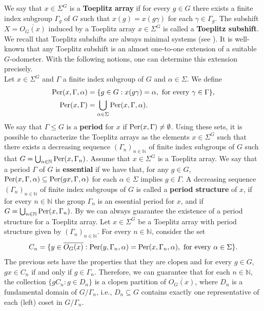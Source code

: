 \documentclass[titlepage,reqno,10pt]{amsart}
\theoremstyle{definition}
\def\Per{{\rm Per}}
\begin{document}
We say that $x\in\Sigma^G$ is a \textbf{Toeplitz array} if for every $g\in G$ there exists  a finite index subgroup $\Gamma_g$ of $G$ such that $x(g)=x(g\gamma)$ for each $\gamma\in \Gamma_g$.
The subshift $X=\overline{O_G(x)}$ induced by a Toeplitz array $x\in\Sigma^G$ is called a \textbf{Toeplitz subshift}. 
We recall that Toeplitz subshifts are always minimal systems  (see \cite{CoPe08}).
It is well-known that any Toeplitz subshift is an almost one-to-one extension of a suitable $G$-odometer.
With the following notions, one can determine this extension precisely.\\
Let $x\in \Sigma^G$ and $\Gamma$ a finite index subgroup of $G$ and $\alpha\in\Sigma$.
We define
\begin{align*}
    \Per(x,\Gamma,\alpha)&=\{g\in G: x(g\gamma)=\alpha, \mbox{ for every }\gamma\in \Gamma\},\\
    \Per(x,\Gamma)&=\bigcup_{\alpha\in \Sigma}\Per(x,\Gamma,\alpha).
\end{align*}
We say that $\Gamma\leq G$ is a \textbf{period} for $x$ if $\Per(x,\Gamma)\neq \emptyset$.
Using these sets, it is possible to characterize the Toeplitz arrays as the elements $x\in\Sigma^G$ such that there exists a decreasing sequence $(\Gamma_n)_{n\in\mathbb{N}}$ of finite index subgroups of $G$ such that $G=\bigcup_{n\in\mathbb{N}}\Per(x,\Gamma_n)$.
Assume that $x\in\Sigma^G$ is a Toeplitz array.
We say that a period $\Gamma$ of $G$ is \textbf{essential} if we have that, for any $g\in G$, $\Per(x,\Gamma,\alpha)\subseteq \Per(gx,\Gamma,\alpha)$ for each $\alpha\in\Sigma$ implies $g\in\Gamma$.
A decreasing sequence $(\Gamma_n)_{n\in\mathbb{N}}$ of finite index subgroups of $G$ is called a \textbf{period structure} of $x$, if for every $n\in\mathbb{N}$ the group $\Gamma_n$ is an essential period for $x$, and if $G=\bigcup_{n\in\mathbb{N}}\Per(x,\Gamma_n)$.
By \cite[Corollary 6]{CoPe08} we can always guarantee the existence of a period structure for a Toeplitz array.
Let $x\in\Sigma^G$ be a Toeplitz array with period structure given by $(\Gamma_n)_{n\in\mathbb{N}}$. For every $n\in\mathbb{N}$, consider the set 
\begin{align*}
    C_n=\{y\in \overline{O_G(x)}:\Per(y,\Gamma_n,\alpha)=\Per(x,\Gamma_n,\alpha), \mbox{ for every }\alpha\in\Sigma\}.
\end{align*}
The previous sets have the properties that they are clopen and for every $g\in G$, $gx\in C_n$ if and only if $g\in \Gamma_n$.
 Therefore, we can guarantee that for each $n\in\mathbb{N}$, the collection $\{gC_n:g\in D_n\}$ is a clopen partition of $\overline{O_G(x)}$, where $D_n$ is a fundamental domain of $G/\Gamma_n$, i.e., $D_n\subseteq G$ contains exactly one representative of each (left) coset in $G/\Gamma_n$.
\end{document}
